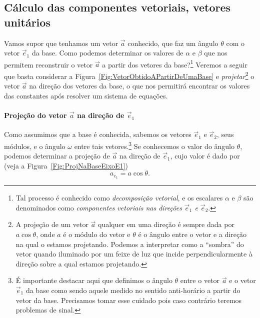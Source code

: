 \subsection{Cálculo das componentes vetoriais, vetores unitários}

Vamos supor que tenhamos um vetor $\vec{a}$ conhecido, que faz um ângulo $\theta$ com o vetor $\vec{e}_1$ da base. Como podemos determinar os valores de $\alpha$ e $\beta$ que nos permitem reconstruir o vetor $\vec{a}$ a partir dos vetores da base?\footnote[][-1cm]{Tal processo é conhecido como \emph{decomposição vetorial}, e os escalares $\alpha$ e $\beta$ são denominados como \emph{componentes vetoriais nas direções $\vec{e}_1$ e $\vec{e}_2$}.} Veremos a seguir que basta considerar a Figura~\ref{Fig:VetorObtidoAPartirDeUmaBase} e \emph{projetar}\footnote{A projeção de um vetor $\vec{a}$ qualquer em uma direção é sempre dada por $a\cos\theta$, onde $a$ é o módulo do vetor e $\theta$ é o ângulo entre o vetor e a direção na qual o estamos projetando. Podemos a interpretar como a ``sombra'' do vetor quando iluminado por um feixe de luz que incide perpendicularmente à direção sobre a qual estamos projetando.} o vetor $\vec{a}$ na direção dos vetores da base, o que nos permitirá encontrar os valores das constantes após resolver um sistema de equações.

\paragraph{Projeção do vetor $\vec{a}$ na direção de $\vec{e}_1$}
Como assumimos que a base é conhecida, sabemos os vetores $\vec{e}_1$ e $\vec{e}_2$, seus módulos, e o ângulo $\omega$ entre tais vetores.\footnote{É importante destacar aqui que definimos o ângulo $\theta$ entre o vetor $\vec{a}$ e o vetor $\vec{e}_1$ da base como sendo aquele medido no sentido anti-horário a partir do vetor da base. Precisamos tomar esse cuidado pois caso contrário teremos problemas de sinal.} Se conhecemos o valor do ângulo $\theta$, podemos determinar a projeção de $\vec{a}$ na direção de $\vec{e}_1$, cujo valor é dado por (veja a Figura~\ref{Fig:ProjNaBaseEixoE1})%
\begin{equation}\label{Eq:ProjAEmE1}
	a_{e_1} = a \cos\theta.
\end{equation}

